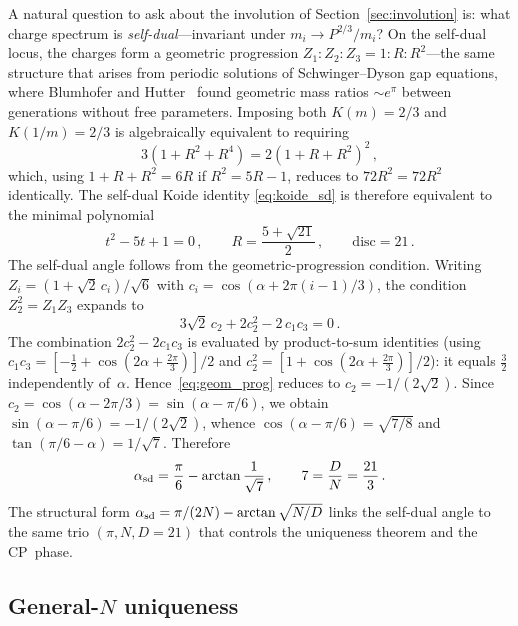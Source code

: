 \documentclass[12pt,a4paper]{article}
\newcommand{\disc}{\mathrm{disc}}
\begin{document}
A natural question to ask about the involution of
Section~\ref{sec:involution} is: what charge spectrum is
\emph{self-dual}---invariant under $m_i \to P^{2/3}/m_i$?
On the self-dual locus, the charges form a geometric progression
$Z_1 : Z_2 : Z_3 = 1 : R : R^2$---the same structure that arises
from periodic solutions of Schwinger--Dyson gap equations, where
Blumhofer and Hutter~\cite{BlumhoferHutter:1997} found geometric
mass ratios $\sim e^\pi$ between generations without free parameters.
Imposing both $K(m)=2/3$
and $K(1/m)=2/3$ is algebraically equivalent to requiring
\begin{equation}
  3(1 + R^2 + R^4) = 2(1 + R + R^2)^2\,,
  \label{eq:koide_sd}
\end{equation}
which, using $1{+}R{+}R^2 = 6R$ if $R^2 = 5R{-}1$, reduces to
$72R^2 = 72R^2$ identically. The self-dual Koide identity
\eqref{eq:koide_sd} is therefore equivalent to the minimal polynomial
\begin{equation}
  t^2 - 5t + 1 = 0\,,
  \qquad
  R = \frac{5+\sqrt{21}}{2}\,,
  \qquad
  \disc = 21\,.
  \label{eq:selfdual}
\end{equation}
The self-dual angle follows from the geometric-progression
condition.  Writing $Z_i = (1 + \sqrt{2}\,c_i)/\sqrt{6}$ with
$c_i = \cos(\alpha + 2\pi(i{-}1)/3)$, the condition $Z_2^2 = Z_1 Z_3$
expands to
\begin{equation}
  3\sqrt{2}\,c_2 + 2c_2^2 - 2\,c_1 c_3 = 0\,.
  \label{eq:geom_prog}
\end{equation}
The combination $2c_2^2 - 2c_1c_3$ is evaluated by
product-to-sum identities (using $c_1 c_3 =
[-\tfrac{1}{2}+\cos(2\alpha{+}\tfrac{2\pi}{3})]/2$ and
$c_2^2 = [1+\cos(2\alpha{+}\tfrac{2\pi}{3})]/2$):
it equals $\frac{3}{2}$ independently of~$\alpha$.
Hence~\eqref{eq:geom_prog} reduces to
$c_2 = -1/(2\sqrt{2})$.
Since $c_2 = \cos(\alpha - 2\pi/3) = \sin(\alpha - \pi/6)$,
we obtain $\sin(\alpha - \pi/6) = -1/(2\sqrt{2})$, whence
$\cos(\alpha - \pi/6) = \sqrt{7/8}$ and
$\tan(\pi/6 - \alpha) = 1/\sqrt{7}$.  Therefore
\begin{equation}
  \alpha_{\rm sd} = \frac{\pi}{6} - \arctan\frac{1}{\sqrt{7}}\,,
  \qquad 7 = \frac{D}{N} = \frac{21}{3}\,.
  \label{eq:alpha_sd}
\end{equation}
The structural form
$\alpha_{\rm sd} = \pi/(2N) - \arctan\sqrt{N/D}$ links the self-dual
angle to the same trio $(\pi, N, D{=}21)$ that controls the uniqueness
theorem and the CP~phase.

\subsection{General-$N$ uniqueness}
\end{document}
